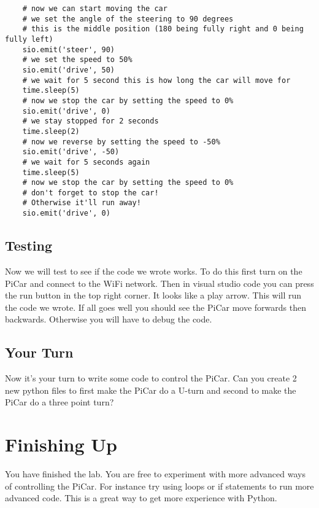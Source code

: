 \documentclass[11pt]{report}
\begin{document}
\begin{verbatim}
    # now we can start moving the car
    # we set the angle of the steering to 90 degrees
    # this is the middle position (180 being fully right and 0 being fully left)
    sio.emit('steer', 90)
    # we set the speed to 50%
    sio.emit('drive', 50)
    # we wait for 5 second this is how long the car will move for
    time.sleep(5)
    # now we stop the car by setting the speed to 0%
    sio.emit('drive', 0)
    # we stay stopped for 2 seconds
    time.sleep(2)
    # now we reverse by setting the speed to -50%
    sio.emit('drive', -50)
    # we wait for 5 seconds again
    time.sleep(5)
    # now we stop the car by setting the speed to 0%
    # don't forget to stop the car!
    # Otherwise it'll run away!
    sio.emit('drive', 0)
    \end{verbatim}

\section{Testing}
Now we will test to see if the code we wrote works. To do this first turn on
the PiCar and connect to the WiFi network. Then in visual studio code you can
press the run button in the top right corner. It looks like a play arrow. This
will run the code we wrote. If all goes well you should see the PiCar move
forwards then backwards. Otherwise you will have to debug the code.

\section{Your Turn}

Now it's your turn to write some code to control the PiCar. Can you create 2
new python files to first make the PiCar do a U-turn and second to make the
PiCar do a three point turn?

\chapter{Finishing Up}
You have finished the lab. You are free to experiment with more advanced ways
of controlling the PiCar. For instance try using loops or if statements to run
more advanced code. This is a great way to get more experience with Python.
\end{document}
